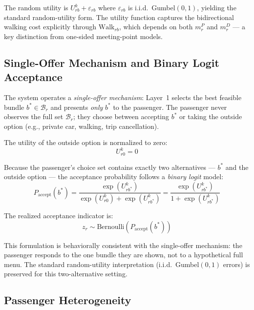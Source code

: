 The random utility is $U_{rb}^k + \varepsilon_{rb}$ where $\varepsilon_{rb}$ is i.i.d.\
Gumbel$(0,1)$, yielding the standard random-utility form. The utility function captures the
bidirectional walking cost explicitly through $\text{Walk}_{rb}$, which depends on both
$m_r^P$ and $m_r^D$ --- a key distinction from one-sided meeting-point models.

\subsection{Single-Offer Mechanism and Binary Logit Acceptance}

The system operates a \emph{single-offer mechanism}: Layer~1 selects the best feasible
bundle $b^* \in \mathcal{B}_r$ and presents \emph{only} $b^*$ to the passenger. The
passenger never observes the full set $\mathcal{B}_r$; they choose between accepting $b^*$
or taking the outside option (e.g., private car, walking, trip cancellation).

The utility of the outside option is normalized to zero:
\begin{equation}\label{eq:utility-outside}
  U_{r0}^k = 0
\end{equation}

Because the passenger's choice set contains exactly two alternatives --- $b^*$ and the
outside option --- the acceptance probability follows a \emph{binary logit} model:
\begin{equation}\label{eq:binary-logit}
  P_{\text{accept}}(b^*) = \frac{\exp(U_{rb^*}^k)}{\exp(U_{r0}^k) + \exp(U_{rb^*}^k)}
                         = \frac{\exp(U_{rb^*}^k)}{1 + \exp(U_{rb^*}^k)}
\end{equation}

The realized acceptance indicator is:
\begin{equation}\label{eq:acceptance-indicator}
  z_r \sim \text{Bernoulli}\!\left(P_{\text{accept}}(b^*)\right)
\end{equation}

This formulation is behaviorally consistent with the single-offer mechanism: the passenger
responds to the one bundle they are shown, not to a hypothetical full menu. The standard
random-utility interpretation (i.i.d.\ Gumbel$(0,1)$ errors) is preserved for this
two-alternative setting.

\subsection{Passenger Heterogeneity}

